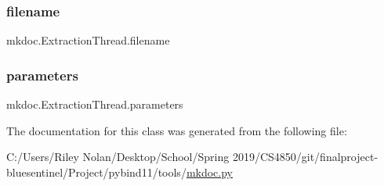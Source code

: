 \subsubsection{\texorpdfstring{filename}{filename}}
{\footnotesize\ttfamily mkdoc.\+Extraction\+Thread.\+filename}

\mbox{\label{classmkdoc_1_1_extraction_thread_a277cdba156da8e57176aa7aee0bece1c}} 
\subsubsection{\texorpdfstring{parameters}{parameters}}
{\footnotesize\ttfamily mkdoc.\+Extraction\+Thread.\+parameters}



The documentation for this class was generated from the following file\+:\begin{DoxyCompactItemize}
\item 
C\+:/\+Users/\+Riley Nolan/\+Desktop/\+School/\+Spring 2019/\+C\+S4850/git/finalproject-\/bluesentinel/\+Project/pybind11/tools/\mbox{\hyperlink{mkdoc_8py}{mkdoc.\+py}}\end{DoxyCompactItemize}
